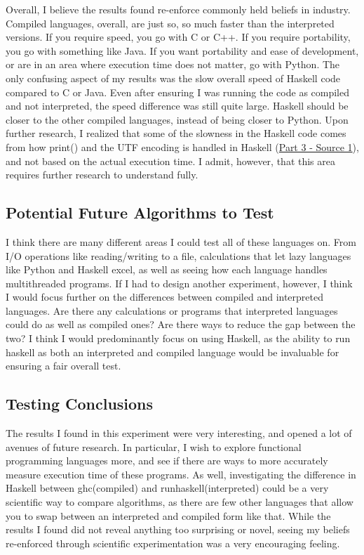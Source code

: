 \documentclass{article}
\begin{document}
    \medskip\noindent Overall, I believe the results found re-enforce commonly held beliefs in industry. Compiled languages, overall, are just so, so much faster than the interpreted versions. If you require speed, you go with C or C++. If you require portability, you go with something like Java. If you want portability and ease of development, or are in an area where execution time does not matter, go with Python. The only confusing aspect of my results was the slow overall speed of Haskell code compared to C or Java. Even after ensuring I was running the code as compiled and not interpreted, the speed difference was still quite large. Haskell should be closer to the other compiled languages, instead of being closer to Python. Upon further research, I realized that some of the slowness in the Haskell code comes from how print() and the UTF encoding is handled in Haskell (\href {https://stackoverflow.com/questions/57124974/why-is-this-simple-haskell-program-so-slow}{Part 3 - Source 1}), and not based on the actual execution time. I admit, however, that this area requires further research to understand fully. 
    
    \subsection{Potential Future Algorithms to Test}
    \medskip\noindent I think there are many different areas I could test all of these languages on. From I/O operations like reading/writing to a file, calculations that let lazy languages like Python and Haskell excel, as well as seeing how each language handles multithreaded programs. If I had to design another experiment, however, I think I would focus further on the differences between compiled and interpreted languages. Are there any calculations or programs that interpreted languages could do as well as compiled ones? Are there ways to reduce the gap between the two? I think I would predominantly focus on using Haskell, as the ability to run haskell as both an interpreted and compiled language would be invaluable for ensuring a fair overall test. 
    \subsection{Testing Conclusions}
    \medskip\noindent The results I found in this experiment were very interesting, and opened a lot of avenues of future research. In particular, I wish to explore functional programming languages more, and see if there are ways to more accurately measure execution time of these programs. As well, investigating the difference in Haskell between ghc(compiled) and runhaskell(interpreted) could be a very scientific way to compare algorithms, as there are few other languages that allow you to swap between an interpreted and compiled form like that. While the results I found did not reveal anything too surprising or novel, seeing my beliefs re-enforced through scientific experimentation was a very encouraging feeling. 
\end{document}
